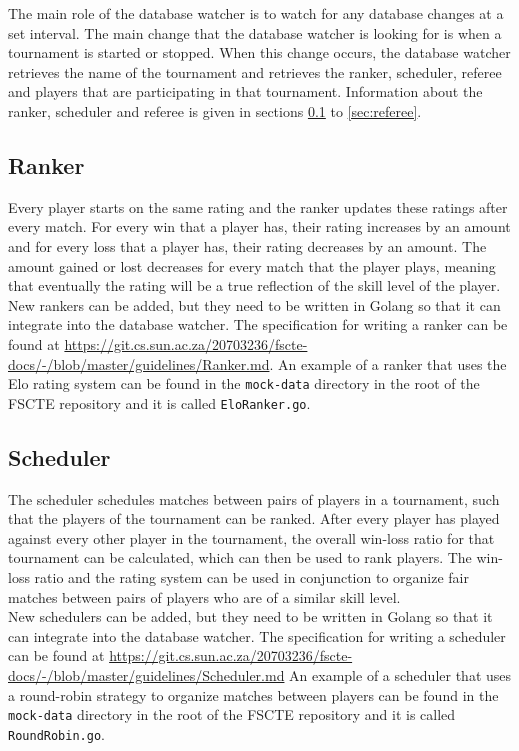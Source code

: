 \documentclass[a4paper, 11pt]{report}
\begin{document}
The main role of the database watcher is to watch for any database changes at a
set interval. The main change that the database watcher is looking for is when a
tournament is started or stopped. When this change occurs, the database watcher
retrieves the name of the tournament and retrieves the ranker, scheduler, referee
and players that are participating in that tournament. Information about the
ranker, scheduler and referee is given in sections \ref{sec:ranker} to
\ref{sec:referee}.

\subsection{Ranker}
\label{sec:ranker}

Every player starts on the same rating and the ranker updates these ratings
after every match. For every win that a player has, their rating increases by
an amount and for every loss that a player has, their rating decreases by
an amount. The amount gained or lost decreases for every match that the player
plays, meaning that eventually the rating will be a true reflection of the skill
level of the player. \\

New rankers can be added, but they need to be written in Golang so that it can
integrate into the database watcher. The specification for writing a ranker can
be found at \url{https://git.cs.sun.ac.za/20703236/fscte-docs/-/blob/master/guidelines/Ranker.md}.
An example of a ranker that uses the Elo \cite{elo} rating system can be found in
the \texttt{mock-data} directory in the root of the FSCTE repository and it is
called \texttt{EloRanker.go}.

\subsection{Scheduler}
\label{sec:scheduler}

The scheduler schedules matches between pairs of players in a tournament, such
that the players of the tournament can be ranked. After every player has played
against every other player in the tournament, the overall win-loss ratio for
that tournament can be calculated, which can then be used to rank players. The
win-loss ratio and the rating system can be used in conjunction to organize fair
matches between pairs of players who are of a similar skill level. \\

New schedulers can be added, but they need to be written in Golang so that it
can integrate into the database watcher. The specification for writing a scheduler
can be found at \url{https://git.cs.sun.ac.za/20703236/fscte-docs/-/blob/master/guidelines/Scheduler.md}
An example of a scheduler that uses a round-robin strategy to organize matches
between players can be found in the \texttt{mock-data} directory in the root of
the FSCTE repository and it is called \texttt{RoundRobin.go}.
\end{document}
